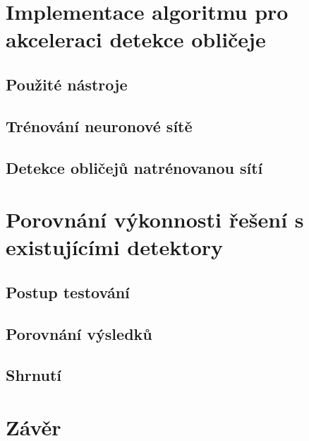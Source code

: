 
\chapter{Implementace algoritmu pro akceleraci detekce obličeje}
\label{kapitola:implementace}


\section{Použité nástroje}


\section{Trénování neuronové sítě}


\section{Detekce obličejů natrénovanou sítí}




\chapter{Porovnání výkonnosti řešení s existujícími detektory}
\label{kapitola:porovnani_vykonnosti}


\section{Postup testování}


\section{Porovnání výsledků}


\section{Shrnutí}


\chapter{Závěr}
\label{kapitola:zaver}
